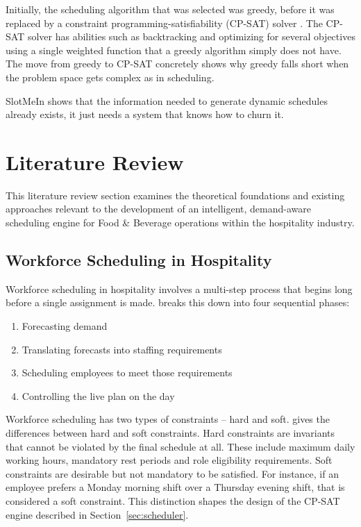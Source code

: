 \documentclass[12pt,a4paper,oneside]{article}
\begin{document}
Initially, the scheduling algorithm that was selected was greedy, before it was replaced by a constraint programming-satisfiability (CP-SAT) solver \citep{ortools2024}. The CP-SAT solver has abilities such as backtracking and optimizing for several objectives using a single weighted function that a greedy algorithm simply does not have. The move from greedy to CP-SAT concretely shows why greedy falls short when the problem space gets complex as in scheduling.

SlotMeIn shows that the information needed to generate dynamic schedules already exists, it just needs a system that knows how to churn it.

\newpage

\section{Literature Review}
\label{sec:literature}

This literature review section examines the theoretical foundations and existing approaches relevant to the development of an intelligent, demand-aware scheduling engine for Food \& Beverage operations within the hospitality industry.

\subsection{Workforce Scheduling in Hospitality}

Workforce scheduling in hospitality involves a multi-step process that begins long before a single assignment is made. \citet{thompson2004} breaks this down into four sequential phases:

  \begin{enumerate}
  \item Forecasting demand
  \item Translating forecasts into staffing requirements
  \item Scheduling employees to meet those requirements
  \item Controlling the live plan on the day
  \end{enumerate}

Workforce scheduling has two types of constraints -- hard and soft. \citet{thompson2004} gives the differences between hard and soft constraints. Hard constraints are invariants that cannot be violated by the final schedule at all. These include maximum daily working hours, mandatory rest periods and role eligibility requirements. Soft constraints are desirable but not mandatory to be satisfied. For instance, if an employee prefers a Monday morning shift over a Thursday evening shift, that is considered a soft constraint. This distinction shapes the design of the CP-SAT engine described in Section~\ref{sec:scheduler}.
\end{document}
